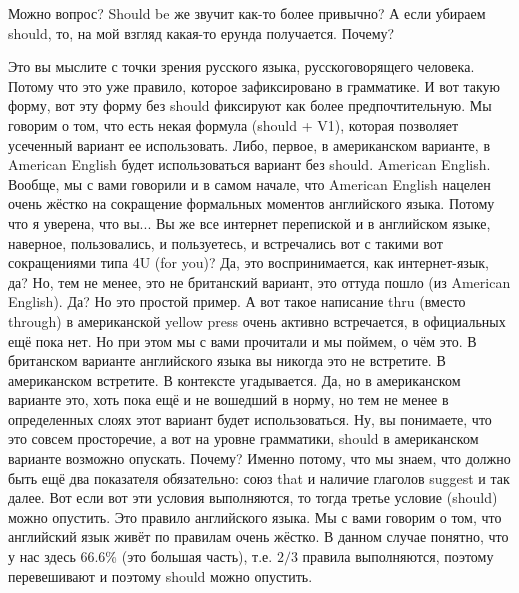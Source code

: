 \documentclass[main.tex]{subfiles}
\begin{document}
Можно вопрос?
Should be же звучит как-то более привычно?
А если убираем should, то, на мой взгляд какая-то ерунда получается.
Почему?

Это вы мыслите с точки зрения русского языка, русскоговорящего человека.
Потому что это уже правило, которое зафиксировано в грамматике.
И вот такую форму, вот эту форму без should фиксируют как более предпочтительную.
Мы говорим о том, что есть некая формула (should + V1), которая позволяет усеченный вариант ее использовать.
Либо, первое, в американском варианте, в American English будет использоваться вариант без should.
American English.
Вообще, мы с вами говорили и в самом начале, что American English нацелен очень жёстко на сокращение формальных моментов английского языка.
Потому что я уверена, что вы...
Вы же все интернет перепиской и в английском языке, наверное, пользовались, и пользуетесь, и встречались вот с такими вот сокращениями типа 4U (for you)?
Да, это воспринимается, как интернет-язык, да?
Но, тем не менее, это не британский вариант, это оттуда пошло (из American English).
Да?
Но это простой пример.
А вот такое написание thru (вместо through) в американской yellow press очень активно встречается, в официальных ещё пока нет.
Но при этом мы с вами прочитали и мы поймем, о чём это.
В британском варианте английского языка вы никогда это не встретите.
В американском встретите.
В контексте угадывается.
Да, но в американском варианте это, хоть пока ещё и не вошедший в норму, но тем не менее в определенных слоях этот вариант будет использоваться.
Ну, вы понимаете, что это совсем просторечие, а вот на уровне грамматики, should в американском варианте возможно опускать.
Почему?
Именно потому, что мы знаем, что должно быть ещё два показателя обязательно: союз that и наличие глаголов suggest и так далее.
Вот если вот эти условия выполняются, то тогда третье условие (should) можно опустить.
Это правило английского языка.
Мы с вами говорим о том, что английский язык живёт по правилам очень жёстко.
В данном случае понятно, что у нас здесь 66.6\% (это большая часть), т.е. $2/3$ правила выполняются, поэтому перевешивают и поэтому should можно опустить.
\end{document}

